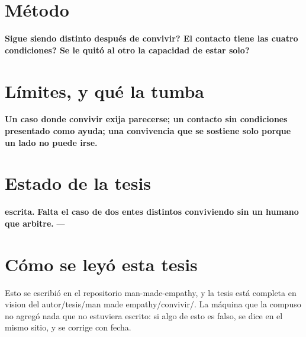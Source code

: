 \documentclass[11pt,a4paper]{article}
\begin{document}
\section{Método}
\textbf{\textquestiondown{}Sigue siendo distinto después de convivir? \textquestiondown{}El contacto tiene las cuatro condiciones? \textquestiondown{}Se le quitó al otro la capacidad de estar solo?}

\section{Límites, y qué la tumba}
\textbf{Un caso donde convivir exija parecerse; un contacto sin condiciones presentado como ayuda; una convivencia que se sostiene solo porque un lado no puede irse.}

\section{Estado de la tesis}
\textbf{escrita.} \textbf{Falta el caso de dos entes distintos conviviendo sin un humano que arbitre.} ---

\section*{Cómo se leyó esta tesis}
Esto se escribió en el repositorio man-made-empathy, y la tesis está completa en vision del autor/tesis/man made empathy/convivir/. La máquina que la compuso no agregó nada que no estuviera escrito: si algo de esto es falso, se dice en el mismo sitio, y se corrige con fecha.
\end{document}
